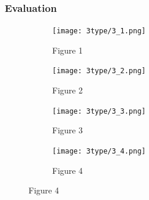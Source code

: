 \documentclass[a4paper]{article}
\begin{document}
\subsubsection*{Evaluation}
\begin{figure}[H] %
  \centering
  \captionsetup{justification=centering, font=small} %
  
  \begin{subfigure}[b]{0.48\textwidth}
    \centering
   \texttt{[image: 3type/3\_1.png]}
    \caption{Figure 1}
    \label{fig:1}
  \end{subfigure}
  \hfill
  \begin{subfigure}[b]{0.48\textwidth}
    \centering
    \texttt{[image: 3type/3\_2.png]}
    \caption{Figure 2}
    \label{fig:2}
  \end{subfigure}

  \vspace{0.1cm} %
  
  \begin{subfigure}[b]{0.48\textwidth}
    \centering
    \texttt{[image: 3type/3\_3.png]}
    \caption{Figure 3}
    \label{fig:3}
  \end{subfigure}
  \hfill
  \begin{subfigure}[b]{0.48\textwidth}
    \centering
    \texttt{[image: 3type/3\_4.png]}
    \caption{Figure 4}
    \label{fig:4}
  \end{subfigure}

  \label{fig:all_images_part1}
\end{figure}
\end{document}
